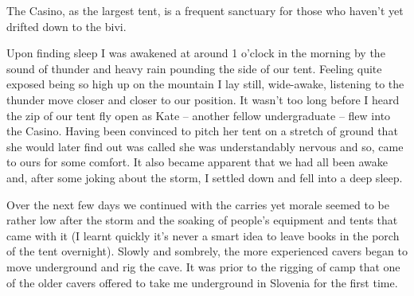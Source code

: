 \begin{marginfigure}
\checkoddpage \ifoddpage \forcerectofloat \else \forceversofloat \fi
\centering
 \caption{The Casino, as the largest tent, is a frequent sanctuary for those who haven't yet drifted down to the bivi. }
 \label{playing cards}
\end{marginfigure}


Upon finding sleep I was awakened at around 1
o'clock in the morning by the sound of thunder and heavy rain pounding
the side of our tent. Feeling quite exposed being so high up on the
mountain I lay still, wide-awake, listening to the thunder move closer
and closer to our position. It wasn't too long before I heard the zip of
our tent fly open as Kate -- another fellow undergraduate -- flew into the
Casino. Having been convinced to pitch her tent on a stretch of ground
that she would later find out was called  she was
understandably nervous and so, came to ours for some comfort. It also
became apparent that we had all been awake and, after some joking about
the storm, I settled down and fell into a deep sleep.

Over the next few days we continued with the carries yet morale seemed to
be rather low after the storm and the soaking of people's equipment and
tents that came with it (I learnt quickly it's never a smart idea to
leave books in the porch of the tent overnight). Slowly and sombrely,
the more experienced cavers began to move underground and rig the cave.
It was prior to the rigging of camp that one of the older cavers offered
to take me underground in Slovenia for the first time.

